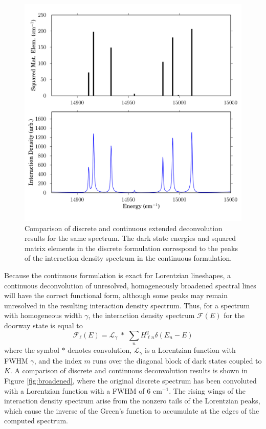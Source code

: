 \documentclass[12pt]{mitthesis}
\begin{document}
\begin{figure}
  \caption{Comparison of discrete and continuous extended
    deconvolution results for the same spectrum.  The dark state
    energies and squared matrix elements in the discrete formulation
    correspond to the peaks of the interaction density spectrum in the
    continuous formulation.}
  \label{fig:compare-dark}
  \centering
  \includegraphics[width=6in]{smalley-compare-fwhm1.png}
\end{figure}

Because the continuous formulation is exact for Lorentzian lineshapes,
a continuous deconvolution of unresolved, homogeneously broadened
spectral lines will have the correct functional form, although some
peaks may remain unresolved in the resulting interaction density
spectrum.  Thus, for a spectrum with homogeneous width $\gamma$, the
interaction density spectrum $\mathcal{F}(E)$ for the doorway state is
equal to
\begin{equation}
  \mathcal{F}_{\ell}(E) = 
    \mathcal{L}_{\gamma} \; * \;
    \sum_n H_{\ell n}^2 \delta(E_n - E)
\end{equation}
where the symbol $*$ denotes convolution, $\mathcal{L}_{\gamma}$ is a
Lorentzian function with FWHM $\gamma$, and the index $m$ runs over
the diagonal block of dark states coupled to $K$.  A comparison of
discrete and continuous deconvolution results is shown in Figure
\ref{fig:broadened}, where the original discrete spectrum has been
convoluted with a Lorentzian function with a FWHM of 6 cm$^{-1}$.  The
rising wings of the interaction density spectrum arise from the
nonzero tails of the Lorentzian peaks, which cause the inverse of the
Green's function to accumulate at the edges of the computed spectrum.
\end{document}
